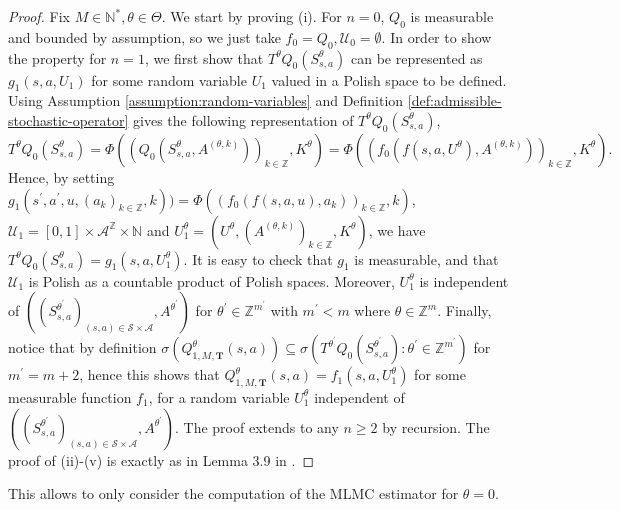 \documentclass[11pt]{article}
\numberwithin{equation}{section}
\theoremstyle{definition}
\theoremstyle{remark}
\def\N{{\mathbb{N}}}
\def\Z{{\mathbb{Z}}}
\newcommand{\citet}{\cite}
\begin{document}
\begin{proof}
	Fix $M \in \N^*, \theta \in \Theta$. We start by proving (i). For $n = 0$, $Q_0$ is measurable and bounded by assumption, so we just take $f_0 = Q_0, \mathcal U_0 = \emptyset$. In order to show the property for $n=1$, we first show that $T^\theta Q_0 (S_{s,a}^\theta)$ can be represented as $g_1(s,a,U_1)$ for some random variable $U_1$ valued in a Polish space to be defined. Using Assumption \ref{assumption:random-variables} and Definition \ref{def:admissible-stochastic-operator} gives the following representation of $ T^\theta Q_0(S_{s,a}^\theta)$,
	\begin{equation}
	\label{eq:representation-TQ0}
	T^\theta Q_0(S_{s,a}^\theta) = \Phi \left(\left(Q_0 \left(S_{s,a}^\theta,A^{(\theta,k)} \right)\right)_{k \in \Z}, K^\theta\right) = \Phi \left( \left(f_0 \left(f \left(s,a,U^\theta \right),A^{(\theta, k)}\right)\right)_{k \in \Z}, K^\theta\right).
	\end{equation}
	Hence, by setting $g_1(s^\prime,a^\prime,u,(a_k)_{k \in \Z},k)) = \Phi\left(\left(f_0(f(s,a,u),a_k)\right)_{k \in \Z},k\right)$, $\mathcal U_1 = [0,1] \times \mathcal A ^{\Z} \times \N$ and $U_1^\theta = (U^\theta, (A^{(\theta,k)})_{k \in \Z}, K^\theta)$, we have $T^\theta Q_0 (S_{s,a}^\theta) = g_1(s,a,U_1^\theta)$. It is easy to check that $g_1$ is measurable, and that $\mathcal U_1$ is Polish as a countable product of Polish spaces. Moreover, $U^\theta_1$ is independent of $\left((S^{\theta^\prime}_{s,a} )_{(s,a) \in \mathcal S \times \mathcal A}, A^{\theta^\prime}\right)$ for $\theta^\prime \in \Z^{m^\prime}$ with $m^\prime < m$ where $\theta \in  \Z^m$. Finally, notice that by definition $\sigma \left(Q_{1,M,\mathbf T}^\theta(s,a) \right) \subseteq \sigma \left( T^{\theta^\prime}Q_0(S^{\theta^\prime}_{s,a}): \theta^\prime \in \Z^{m^\prime}\right)$ for $m^\prime = m + 2$, hence this shows that $Q_{1,M,\mathbf T}^\theta(s,a) = f_1(s,a,U_1^\theta)$ for some measurable function $f_1$, for a random variable $U^\theta_1$ independent of $\left((S^{\theta^\prime}_{s,a})_{(s,a)\in \mathcal S \times \mathcal A}, A^{\theta^\prime} \right)$.  The proof extends to any $n \geq 2$ by recursion. The proof of (ii)-(v) is exactly as in Lemma 3.9 in \citet{hutzenthaler2021multilevel}.
\end{proof}
 This allows to only consider the computation of the MLMC estimator for $\theta = 0$.
\end{document}
